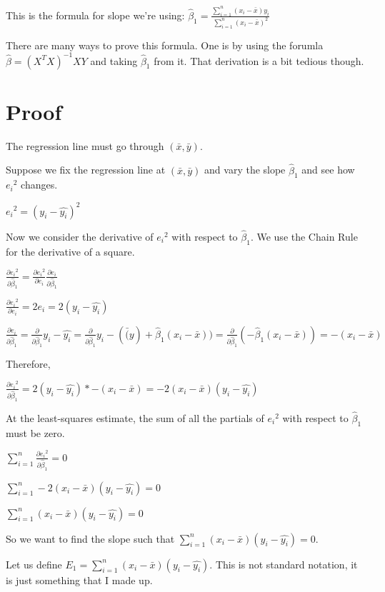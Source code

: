 \documentclass{article}
\begin{document}
This is the formula for slope we're using:
$\hat{\beta}_1=\frac{\sum_{i=1}^{n} (x_i-\bar{x})y_i}{\sum_{i=1}^{n} (x_i-\bar{x})^2}$

There are many ways to prove this formula. One is by using the forumla $\hat{\beta} = (X^T X)^{-1}XY$ and taking $\hat{\beta}_1$ from it.
That derivation is a bit tedious though.

\section{Proof}

The regression line must go through $(\bar{x}, \bar{y})$. %

Suppose we fix the regression line at $(\bar{x}, \bar{y})$ and vary the slope $\hat{\beta}_1$ and see how ${e_i}^2$ changes.

${e_i}^2=(y_i-\hat{y_i})^2$

Now we consider the derivative of ${e_i}^2$ with respect to $\hat{\beta}_1$. We use the Chain Rule for the derivative of a square.

$\frac{\partial {e_i}^2}{\partial \hat{\beta}_1} = \frac{\partial {e_i}^2}{\partial e_i} \frac{\partial {e_i}}{\partial \hat{\beta}_1}$

$\frac{\partial {e_i}^2}{\partial e_i} = 2e_i = 2(y_i-\hat{y_i})$

$\frac{\partial {e_i}}{\partial \hat{\beta}_1} = \frac{\partial}{\partial \hat{\beta}_1} y_i-\hat{y_i} = \frac{\partial}{\partial \hat{\beta}_1} y_i-(\bar(y) + \hat{\beta}_1(x_i-\bar{x})) = \frac{\partial}{\partial \hat{\beta}_1} (- \hat{\beta}_1(x_i-\bar{x})) = -(x_i-\bar{x})$

Therefore,

$\frac{\partial {e_i}^2}{\partial \hat{\beta}_1} = 2(y_i-\hat{y_i}) * -(x_i-\bar{x}) = -2(x_i-\bar{x})(y_i-\hat{y_i})$

At the least-squares estimate, the sum of all the partials of ${e_i}^2$ with respect to $\hat{\beta}_1$ must be zero.

$\sum_{i=1}^{n}\frac{\partial {e_i}^2}{\partial \hat{\beta}_1}=0$

$\sum_{i=1}^{n}-2(x_i-\bar{x})(y_i-\hat{y_i})=0$

$\sum_{i=1}^{n}(x_i-\bar{x})(y_i-\hat{y_i})=0$

So we want to find the slope such that $\sum_{i=1}^{n}(x_i-\bar{x})(y_i-\hat{y_i})=0$.

Let us define $E_1 = \sum_{i=1}^{n}(x_i-\bar{x})(y_i-\hat{y_i})$. This is not standard notation, it is just something that I made up.
\end{document}
